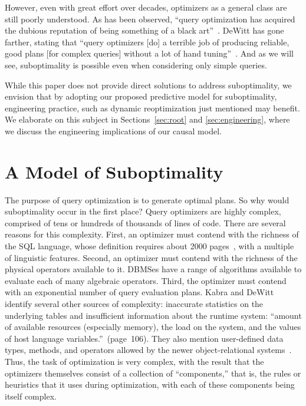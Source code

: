 \documentclass[prodmode,acmtods]{acmsmall}
\begin{document}
However, even with great effort over decades, optimizers as a general class
are still poorly understood. As has been observed, ``query optimization has
acquired the dubious reputation of being something of a black
art''~\cite{Babcock05}. DeWitt has gone farther, stating that ``query
optimizers [do] a terrible job of producing reliable, good plans [for
  complex queries] without a lot of hand
tuning''~\cite[page~59]{winslett02}. And as we will see, suboptimality is
possible even when considering only simple queries.

While this paper does not provide direct solutions to address
suboptimality, we envision that by adopting our proposed predictive model
for suboptimality, engineering practice, such as dynamic reoptimization just
mentioned may benefit. We elaborate on this subject in
Sections~\ref{sec:root} and \ref{sec:engineering}, where we discuss the engineering implications
of our causal model.

\section{A Model of Suboptimality}\label{sec:model}

The purpose of query optimization is to generate optimal plans.  So
why would suboptimality occur in the first place? Query optimizers are
highly complex, comprised of tens or hundreds of thousands of lines of code. There
are several reasons for this complexity. First, an optimizer must
contend with the richness of the SQL language, whose definition
requires about 2000 pages~\cite{SQL2008}, with a multiple of
linguistic features. Second, an optimizer must contend with the
\hbox{richness} of the physical operators available to it. \hbox{DBMSes} have a
range of algorithms available to evaluate each of many algebraic
operators. Third, the optimizer must contend with an exponential
number of query evaluation plans. Kabra and DeWitt~\cite{kabra98}
identify several other sources of complexity: inaccurate statistics on
the underlying tables and insufficient information about the runtime
system: ``amount of available resources (especially memory), the load
on the system, and the values of host language
variables.''~(page~106). They also mention user-defined data types,
methods, and operators allowed by the newer object-relational
systems~\cite{Melton03}. Thus, the task of optimization is very
complex, with the result that the optimizers themselves consist of a
collection of ``components,'' that is, the rules or heuristics that it
uses during optimization, with each of these components being itself
complex.
\end{document}
